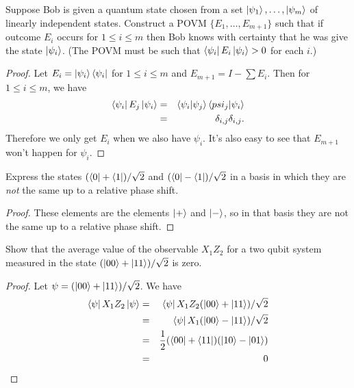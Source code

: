 \documentclass{article}
\begin{document}
\begin{exercise}
  Suppose Bob is given a quantum state chosen from a set $\ket{\psi_1},\dots,\ket{\psi_m}$ of linearly independent states. Construct a POVM $\{E_1,\dots,E_{m+1}\}$ such that if outcome $E_i$ occurs for $1\le i\le m$ then Bob knows with certainty that he was give the state $\ket{\psi_i}$. (The POVM must be such that $\bra{\psi_i}E_i\ket{\psi_i}>0$ for each $i$.)
  \begin{proof}
    Let $E_i=\ket{\psi_i}\bra{\psi_i}$ for $1\le i\le m$ and $E_{m+1}=I-\sum E_i$. Then for $1\le i \le m$, we have
    \begin{eqnarray*}
      \bra{\psi_i}E_j\ket{\psi_i}&=&
      \bra{\psi_i}\ket{\psi_j}\bra{psi_j}\ket{\psi_i} \\
      &=&\delta_{i,j}\delta_{i,j}.
    \end{eqnarray*}
    Therefore we only get $E_i$ when we also have $\psi_i$. It's also easy to see that $E_{m+1}$ won't happen for $\psi_i$.
  \end{proof}
\end{exercise}

\begin{exercise}
  Express the states $(\bra{0}+\bra{1})/\sqrt2$ and $(\bra{0}-\bra{1})/\sqrt2$ in a basis in which they are \textit{not} the same up to a relative phase shift.
  \begin{proof}
    These elements are the elements $\ket{+}$ and $\ket{-}$, so in that basis they are not the same up to a relative phase shift.
  \end{proof}
\end{exercise}

\begin{exercise}
  Show that the average value of the observable $X_1Z_2$ for a two qubit system measured in the state $(\ket{00}+\ket{11})/\sqrt2$ is zero.
  \begin{proof}
    Let $\psi=(\ket{00}+\ket{11})/\sqrt2$. We have
    \begin{eqnarray*}
      \bra{\psi}X_1Z_2\ket{\psi}&=&
      \bra{\psi}X_1Z_2(\ket{00}+\ket{11})/\sqrt2 \\
      &=&\bra{\psi}X_1(\ket{00}-\ket{11})/\sqrt2 \\
      &=&\frac{1}{2}(\bra{00}+\bra{11})(\ket{10}-\ket{01}) \\
      &=&0
    \end{eqnarray*}
  \end{proof}
\end{exercise}
\end{document}
